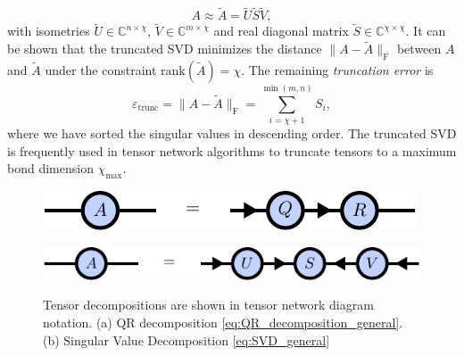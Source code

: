 \begin{equation}
	\label{eq:truncated_SVD_general}
	A \approx \tilde{A} = \tilde{U}\tilde{S}\tilde{V},
\end{equation}
with isometries $\tilde{U}\in\mathbb{C}^{n\times\chi}$, $\tilde{V}\in\mathbb{C}^{m\times\chi}$ and real diagonal matrix $\tilde{S}\in\mathbb{C}^{\chi\times\chi}$. It can be shown \cite{cite:eckart_young_theorem} that the truncated SVD minimizes the distance $\lVert A - \tilde{A} \rVert_\text{F}$ between $A$ and $\tilde{A}$ under the constraint $\text{rank}(\tilde{A}) = \chi$. The remaining \textit{truncation error} is
\begin{equation}
	\varepsilon_\text{trunc} = \lVert A - \tilde{A} \rVert_\text{F} = \sum_{i=\chi+1}^{\min(m,n)} S_i,
\end{equation} 
where we have sorted the singular values in descending order. The truncated SVD is frequently used in tensor network algorithms to truncate tensors to a maximum bond dimension $\chi_\text{max}$. \par
\begin{figure}
	\centering
	\begin{subfigure}[c]{0.1\textwidth}
		\caption{}\label{fig:tensor_decomposition_qr}
	\end{subfigure}%
	\begin{minipage}[c]{0.6\textwidth}
		\raisebox{-26pt}
		{%
			\includegraphics[scale=1]{figures/tikz/Tensor_Networks/tensor_decompositions/tensor_decompositions_a.pdf}
		}
	\end{minipage}
	\begin{subfigure}[c]{0.1\textwidth}
		\caption{}\label{fig:tensor_decomposition_svd}
	\end{subfigure}%
	\begin{minipage}[c]{0.6\textwidth}
		\raisebox{-26pt}
		{%
			\includegraphics[scale=1]{figures/tikz/Tensor_Networks/tensor_decompositions/tensor_decompositions_b.pdf}
		}
	\end{minipage}
	\caption{Tensor decompositions are shown in tensor network diagram notation. (a) QR decomposition \eqref{eq:QR_decomposition_general}. (b) Singular Value Decomposition \eqref{eq:SVD_general}}
	\label{fig:tensor_decomposition_diagrams}
\end{figure}